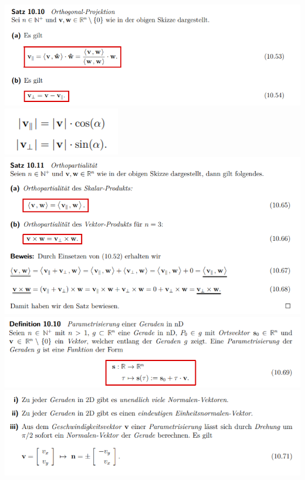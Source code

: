 \includegraphics[width=\columnwidth]{./images/vek21.png}
\includegraphics[width=\columnwidth]{./images/vek22.png}
\includegraphics[width=\columnwidth]{./images/vek23.png}
\includegraphics[width=\columnwidth]{./images/vek24.png}
\includegraphics[width=\columnwidth]{./images/vek25.png}
